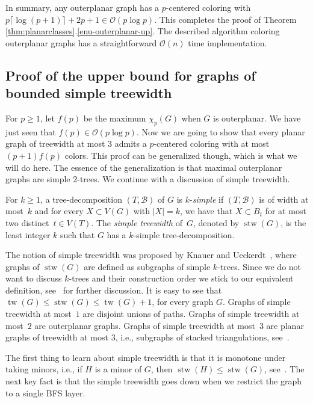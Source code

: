 In summary, any outerplanar graph has a $p$-centered coloring with
$p\lceil \log(p+1)\rceil + 2p +1 \in \mathcal{O}(p\log p)$. This completes the
proof of Theorem \ref{thm:planarclasses}.\ref{enu-outerplanar-up}.
The described algorithm coloring outerplanar graphs has a straightforward $\mathcal{O}(n)$
time implementation.

\subsection{Proof of the upper bound for graphs of bounded simple treewidth}
\label{subsec:simpletree-upper}

For $p\geq1$, let $f(p)$ be the maximum $\chi_p(G)$ when $G$ is outerplanar.
We have just seen that $f(p)\in \mathcal{O}(p\log p)$.  Now we are going to show that
every planar graph of treewidth at most $3$ admits a $p$-centered coloring
with at most $(p+1)f(p)$ colors. This proof can be generalized though, which
is what we will do here. The essence of the generalization is that maximal
outerplanar graphs are simple $2$-trees.  We continue with a discussion of
simple treewidth.

For $k\geq1$, a tree-decomposition $(T,\mathcal{B})$ of $G$ is $k$-\emph{simple} 
if $(T,\mathcal{B})$ is of width at most~$k$ and for every $X\subset V(G)$ with $|X|=k$, 
we have that $X\subset B_t$ for at most two distinct~$t\in V(T)$. 
The \emph{simple treewidth} of~$G$, denoted by $\operatorname{stw}(G)$, 
is the least integer $k$ such that $G$ has a $k$-simple tree-decomposition. 

The notion of simple treewidth was proposed by Knauer and Ueckerdt~\cite{KU},
where graphs of $\operatorname{stw}(G)$ are defined as subgraphs of simple $k$-trees.  Since
we do not want to discuss $k$-trees and their construction order we stick to
our equivalent definition, see~\cite{W16} for further discussion.  It is easy
to see that $\operatorname{tw}(G)\leq \operatorname{stw}(G)\leq \operatorname{tw}(G)+1$, for every graph $G$.  Graphs
of simple treewidth at most~$1$ are disjoint unions of paths.  Graphs of
simple treewidth at most~$2$ are outerplanar graphs.  Graphs of simple
treewidth at most~$3$ are planar graphs of treewidth at most $3$, i.e.,
subgraphs of stacked triangulations, see~\cite{KV12}.

The first thing to learn about simple treewidth is that it is monotone under taking minors, 
i.e., if $H$ is a minor of $G$, then $\operatorname{stw}(H) \leq \operatorname{stw}(G)$, see~\cite{JM-weak-cols}.
The next key fact is that the simple treewidth goes down when we restrict the graph to
a single BFS layer.

